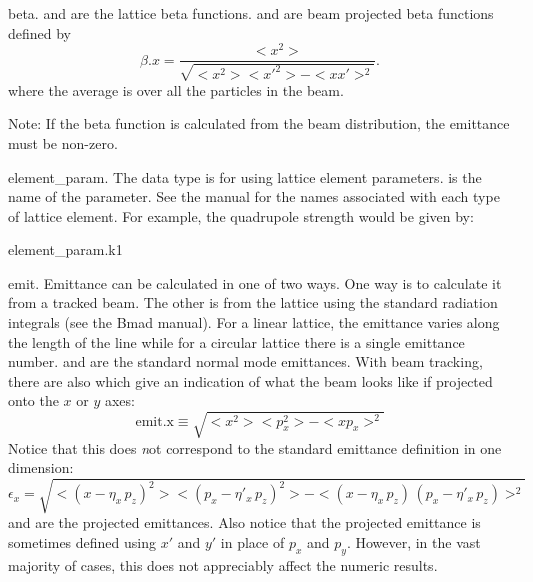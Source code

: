   \begin{description}

  \item{beta.} \Newline
{} and  are the lattice beta functions.  and
 are beam projected beta functions defined by
\begin{equation}
  \beta.x = \frac{<x^{2}>}{\sqrt{<x^{2}> <x'^{2}> - <x x'>^{2}}}.
\end{equation}
where the average \vn{<>} is over all the particles in the beam.

Note: If the beta function is calculated from the beam distribution,
the emittance must be non-zero.

  \item{element\_param.} \Newline
The  data type is for using lattice
element parameters.  is the name of the
parameter. See the \bmad manual for the names associated with each
type of lattice element.  For example, the  quadrupole strength
would be given by:
\begin{example}
  element_param.k1
\end{example}

  \item{emit.} \Newline
Emittance can be calculated in one of two ways. One way is to
calculate it from a tracked beam. The other is from the lattice using
the standard radiation integrals (see the Bmad manual). For a linear
lattice, the emittance varies along the length of the line while for a
circular lattice there is a single emittance number. 
and  are the standard normal mode emittances. With
beam tracking, there are also  which give an
indication of what the beam looks like if projected onto the $x$ or
$y$ axes:
\begin{equation}
  \mbox{emit.x} \equiv \sqrt{<x^2> <p_x^2> - <x p_x>^2}
\end{equation}
Notice that this does {\emph not} correspond to the standard emittance
definition in one dimension:
\begin{equation}
  \epsilon_x = \sqrt{<(x - \eta_x \, p_z)^2> <(p_x - \eta'_x \, p_z)^2> - 
  <(x - \eta_x \, p_z) \, (p_x - \eta'_x \, p_z)>^2}
\end{equation}
 and  are the projected emittances.
Also notice that the projected emittance is sometimes defined using
$x'$ and $y'$ in place of $p_x$ and $p_y$. However, in the vast
majority of cases, this does not appreciably affect the numeric
results.


\end{description}
